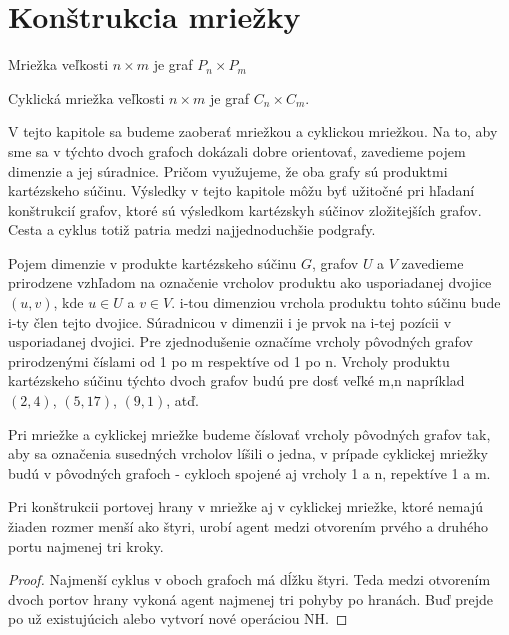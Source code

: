 \chapter{Konštrukcia mriežky}
\begin{defin}
Mriežka veľkosti $ n \times m$ je graf $P_{n} \times P_{m}$
\end{defin}
\begin{defin}
Cyklická mriežka veľkosti $n \times m$ je graf $C_{n} \times C_{m}$.
\end{defin}

V tejto kapitole sa budeme zaoberať mriežkou a cyklickou mriežkou. Na to, aby sme sa v
týchto dvoch grafoch dokázali dobre orientovať, zavedieme pojem dimenzie a
jej súradnice. Pričom využujeme, že oba grafy sú produktmi kartézskeho
súčinu. Výsledky v tejto kapitole môžu byť užitočné pri hľadaní konštrukcií
grafov, ktoré sú výsledkom kartézskyh súčinov zložitejších grafov. Cesta a
cyklus totiž patria medzi najjednoduchšie podgrafy.

\begin{ozn}
Pojem dimenzie v produkte kartézskeho súčinu $G$, grafov $U$ a $V$ 
zavedieme prirodzene vzhľadom
na označenie vrcholov produktu ako usporiadanej dvojice $(u,v)$, kde $u \in
U$ a $v \in V$. i-tou dimenziou vrchola produktu tohto súčinu bude i-ty člen
tejto dvojice. Súradnicou v dimenzii i je prvok na i-tej pozícii v
usporiadanej dvojici. Pre zjednodušenie označíme vrcholy pôvodných grafov
prirodzenými číslami od 1 po m respektíve od 1 po n. Vrcholy produktu
kartézskeho súčinu týchto dvoch grafov budú pre dosť veľké m,n napríklad
$(2,4)$, $(5,17)$, $(9,1)$, atď.
\end{ozn}

\begin{pozn}
Pri mriežke a cyklickej mriežke budeme číslovať vrcholy pôvodných grafov
tak, aby sa označenia susedných vrcholov líšili o jedna, v prípade cyklickej
mriežky budú v pôvodných grafoch - cykloch spojené aj vrcholy 1 a n,
repektíve 1 a m.
\end{pozn}

\begin{veta}
Pri konštrukcii portovej hrany v mriežke aj v cyklickej mriežke, ktoré
nemajú žiaden rozmer menší ako štyri, 
urobí agent medzi otvorením prvého a druhého
portu najmenej tri kroky.
\end{veta}
\begin{proof}
Najmenší cyklus v oboch grafoch má dĺžku štyri. 
Teda medzi otvorením dvoch portov
hrany vykoná agent najmenej tri pohyby po hranách. Buď prejde po už
existujúcich alebo vytvorí nové operáciou NH.
\end{proof}

